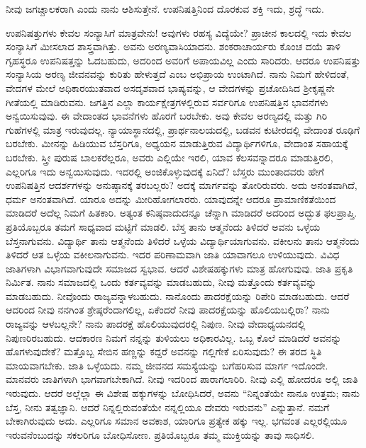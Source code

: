ನೀವು ಜಗಚ್ಚಾಲಕರಾಗಿ ಎಂದು ನಾನು ಆಶಿಸುತ್ತೇನೆ. ಉಪನಿಷತ್ತಿನಿಂದ ದೊರಕುವ ಶಕ್ತಿ ಇದು, ಶ್ರದ್ಧೆ ಇದು.

ಉಪನಿಷತ್ತುಗಳು ಕೇವಲ ಸಂನ್ಯಾಸಿಗೆ ಮಾತ್ರವೇನು! ಅವುಗಳು ರಹಸ್ಯ ವಿದ್ಯೆಯೇ? ಪ್ರಾಚೀನ ಕಾಲದಲ್ಲಿ ಇದು ಕೇವಲ ಸಂನ್ಯಾಸಿಗೆ ಮೀಸಲಾದ ಶಾಸ್ತ್ರವಾಗಿತ್ತು. ಅವನು ಅರಣ್ಯವಾಸಿಯಾದನು. ಶಂಕರಾಚಾರ್ಯರು ಕೊಂಚ ದಯೆ ತಾಳಿ ಗೃಹಸ್ಥರೂ ಉಪನಿಷತ್ತನ್ನು ಓದಬಹುದು, ಅದರಿಂದ ಅವರಿಗೆ ಅಪಾಯವಿಲ್ಲ ಎಂದು ಸಾರಿದರು. ಆದರೂ ಉಪ\-ನಿಷತ್ತು ಸಂನ್ಯಾಸಿಯ ಅರಣ್ಯ ಜೀವನವನ್ನು ಕುರಿತು ಹೇಳುತ್ತದೆ ಎಂಬ ಅಭಿಪ್ರಾಯ ಉಂಟಾಗಿದೆ. ನಾನು ನಿಮಗೆ ಹೇಳಿದಂತೆ, ವೇದಗಳ ಮೇಲೆ ಅಧಿಕಾರಯುತವಾದ ಅಸದೃಶವಾದ ಭಾಷ್ಯವನ್ನು, ಆ ವೇದಗಳನ್ನು ಪ್ರಚೋದಿಸಿದ ಶ‍್ರೀಕೃಷ್ಣನೇ ಗೀತೆಯಲ್ಲಿ ಮಾಡಿರುವನು. ಜಗತ್ತಿನ ಎಲ್ಲಾ ಕಾರ್ಯಕ್ಷೇತ್ರಗಳಲ್ಲಿರುವ ಸರ್ವರಿಗೂ ಉಪನಿಷತ್ತಿನ ಭಾವನೆಗಳು ಅನ್ವಯಿಸುವುವು. ಈ ವೇದಾಂತದ ಭಾವನೆಗಳು ಹೊರಗೆ ಬರಬೇಕು. ಅವು ಕೇವಲ ಅರಣ್ಯದಲ್ಲಿ ಮತ್ತು ಗಿರಿ ಗುಹೆಗಳಲ್ಲಿ ಮಾತ್ರ ಇರುವುದಲ್ಲ. ನ್ಯಾಯಾಸ್ಥಾನದಲ್ಲಿ, ಪ್ರಾರ್ಥನಾಲಯದಲ್ಲಿ, ಬಡವನ ಕುಟೀರದಲ್ಲಿ ವೇದಾಂತ ರೂಢಿಗೆ ಬರಬೇಕು. ಮೀನನ್ನು ಹಿಡಿಯುವ ಬೆಸ್ತರಿಗೂ, ಅಧ್ಯಯನ ಮಾಡುತ್ತಿರುವ ವಿದ್ಯಾರ್ಥಿಗಳಿಗೂ, ವೇದಾಂತ ಸಹಾಯಕ್ಕೆ ಬರಬೇಕು. ಸ್ತ್ರೀ ಪುರುಷ ಬಾಲಕರೆಲ್ಲರೂ, ಅವರು ಎಲ್ಲಿಯೇ ಇರಲಿ, ಯಾವ ಕೆಲಸವನ್ನಾದರೂ ಮಾಡುತ್ತಿರಲಿ, ಎಲ್ಲರಿಗೂ ಇದು ಅನ್ವಯಿಸುವುದು. ಇದರಲ್ಲಿ ಅಂಜಿಕೊಳ್ಳುವುದಕ್ಕೆ ಏನಿದೆ? ಬೆಸ್ತರು ಮುಂತಾದವರು ಹೇಗೆ ಉಪನಿಷತ್ತಿನ ಆದರ್ಶಗಳನ್ನು ಅನುಷ್ಠಾನಕ್ಕೆ ತರಬಲ್ಲರು? ಅದಕ್ಕೆ ಮಾರ್ಗವನ್ನು ತೋರಿರುವರು. ಅದು ಅನಂತವಾಗಿದೆ, ಧರ್ಮ ಅನಂತವಾಗಿದೆ. ಯಾರೂ ಅದನ್ನು ಮೀರಿಹೋಗಲಾರರು. ಯಾವುದನ್ನೇ ಆದರೂ ಪ್ರಾಮಾಣಿಕತೆಯಿಂದ ಮಾಡಿದರೆ ಅದೆಲ್ಲ ನಿಮಗೆ ಹಿತಕಾರಿ. ಅತ್ಯಂತ ಕನಿಷ್ಠವಾದುದನ್ನೂ ಚೆನ್ನಾಗಿ ಮಾಡಿದರೆ ಅದರಿಂದ ಅದ್ಭುತ ಫಲಪ್ರಾಪ್ತಿ. ಪ್ರತಿಯೊಬ್ಬರೂ ತಮಗೆ ಸಾಧ್ಯವಾದ ಮಟ್ಟಿಗೆ ಮಾಡಲಿ. ಬೆಸ್ತ ತಾನು ಆತ್ಮನೆಂದು ತಿಳಿದರೆ ಅವನು ಒಳ್ಳೆಯ ಬೆಸ್ತನಾಗುವನು. ವಿದ್ಯಾರ್ಥಿ ತಾನು ಆತ್ಮನೆಂದು ತಿಳಿದರೆ ಒಳ್ಳೆಯ ವಿದ್ಯಾರ್ಥಿಯಾಗುವನು. ವಕೀಲನು ತಾನು ಆತ್ಮನೆಂದು ತಿಳಿದರೆ ಆತ ಒಳ್ಳೆಯ ವಕೀಲನಾಗುವನು. ಇದರ ಪರಿಣಾಮವಾಗಿ ಜಾತಿ ಯಾವಾಗಲೂ ಉಳಿಯುವುದು. ವಿವಿಧ ಜಾತಿಗಳಾಗಿ ವಿಭಾಗವಾಗುವುದೇ ಸಮಾಜದ ಸ್ವಭಾವ. ಆದರೆ ವಿಶೇಷಹಕ್ಕುಗಳು ಮಾತ್ರ ಹೋಗುವುವು. ಜಾತಿ ಪ್ರಕೃತಿ ನಿರ್ಮಿತ. ನಾನು ಸಮಾಜದಲ್ಲಿ ಒಂದು ಕರ್ತವ್ಯವನ್ನು ಮಾಡಬಹುದು, ನೀವು ಮತ್ತೊಂದು ಕರ್ತವ್ಯವನ್ನು ಮಾಡಬಹುದು. ನೀವೊಂದು ರಾಜ್ಯವನ್ನಾಳಬಹುದು. ನಾನೊಂದು ಪಾದರಕ್ಷೆಯನ್ನು ರಿಪೇರಿ ಮಾಡಬಹುದು. ಆದರೆ ಆದರಿಂದ ನೀವು ನನಗಿಂತ ಶ್ರೇಷ್ಠರೆಂದಾಗಲಿಲ್ಲ, ಏಕೆಂದರೆ ನೀವು ಪಾದರಕ್ಷೆಯನ್ನು ಹೊಲಿಯಬಲ್ಲಿರಾ? ನಾನು ರಾಜ್ಯವನ್ನು ಆಳಬಲ್ಲನೇ? ನಾನು ಪಾದರಕ್ಷೆ ಹೊಲಿಯುವುದರಲ್ಲಿ ನಿಪುಣ. ನೀವು ವೇದಾಧ್ಯಯನದಲ್ಲಿ ನಿಪುಣರಿರಬಹುದು. ಆದಕಾರಣ ನಿಮಗೆ ನನ್ನನ್ನು ತುಳಿಯಲು ಅಧಿಕಾರವಿಲ್ಲ. ಒಬ್ಬ ಕೊಲೆ ಮಾಡಿದರೆ ಅವನನ್ನು ಹೊಗಳುವುದೇಕೆ? ಮತ್ತೊಬ್ಬ ಸೇಬಿನ ಹಣ್ಣನ್ನು ಕದ್ದರೆ ಅವನನ್ನು ಗಲ್ಲಿಗೇಕೆ ಏರಿಸುವುದು? ಈ ತರದ ಸ್ಥಿತಿ ಮಾಯವಾಗಬೇಕು. ಜಾತಿ ಒಳ್ಳೆಯದು. ನಮ್ಮ ಜೀವನದ ಸಮಸ್ಯೆಯನ್ನು ಬಗೆಹರಿಸುವ ಮಾರ್ಗ ಇದೊಂದೇ. ಮಾನವರು ಜಾತಿಗಳಾಗಿ ಭಾಗವಾಗಬೇಕಾಗಿದೆ. ನೀವು ಇದರಿಂದ ಪಾರಾಗಲಾರಿರಿ. ನೀವು ಎಲ್ಲಿ ಹೋದರೂ ಅಲ್ಲಿ ಜಾತಿ ಇರುವುದು. ಆದರೆ ಅಲ್ಲೆಲ್ಲಾ ಈ ವಿಶೇಷ ಹಕ್ಕುಗಳನ್ನು ಬೋಧಿಸಿದರೆ, ಅವನು “ನಿನ್ನಂತೆಯೇ ನಾನೂ ಉತ್ತಮ; ನಾನು ಬೆಸ್ತ, ನೀನು ತತ್ವಜ್ಞಾನಿ. ಆದರೆ ನಿನ್ನಲ್ಲಿರುವಂತೆಯೇ ನನ್ನಲ್ಲಿಯೂ ದೇವರು ಇರುವನು” ಎನ್ನುತ್ತಾನೆ. ನಮಗೆ ಬೇಕಾಗಿರುವುದು ಅದು. ಎಲ್ಲರಿಗೂ ಸಮಾನ ಅವಕಾಶ, ಯಾರಿಗೂ ಪ್ರತ್ಯೇಕ ಹಕ್ಕು ಇಲ್ಲ. ಭಗವಂತ ಎಲ್ಲರಲ್ಲಿಯೂ ಇರುವನೆಂಬುದನ್ನು ಸಕಲರಿಗೂ ಬೋಧಿಸೋಣ. ಪ್ರತಿಯೊಬ್ಬರೂ ತಮ್ಮ ಮುಕ್ತಿಯನ್ನು ತಾವು ಸಾಧಿಸಲಿ.

